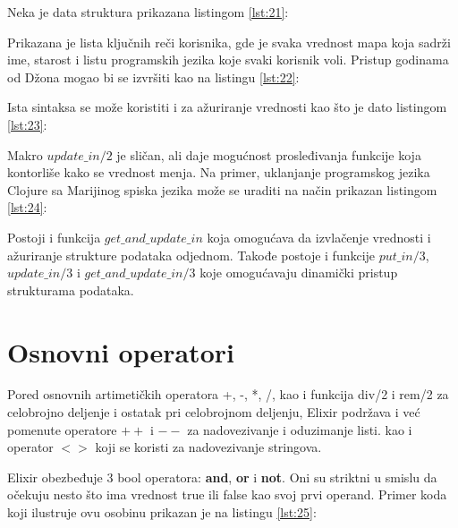 \documentclass[12pt,oneside]{memoir}
\begin{document}
Neka je data struktura prikazana listingom \ref{lst:21}:



Prikazana je lista ključnih reči korisnika, gde je svaka vrednost mapa koja sadrži ime, starost i listu programskih jezika koje svaki korisnik voli. Pristup godinama od Džona mogao bi se izvršiti kao na listingu \ref{lst:22}:



\newpage

Ista sintaksa se može koristiti i za ažuriranje vrednosti kao što je dato listingom \ref{lst:23}:



Makro $update\_in/2$ je sličan, ali daje mogućnost prosleđivanja funkcije koja kontorliše kako se vrednost menja. Na primer, uklanjanje programskog jezika Clojure sa Marijinog spiska jezika može se uraditi na način prikazan listingom \ref{lst:24}:



Postoji i funkcija $get\_and\_update\_in$ koja omogućava da izvlačenje vrednosti i ažuriranje strukture podataka odjednom. Takođe postoje i funkcije $put\_in/3$, $update\_in/3$ i $get\_and\_update\_in/3$ koje omogućavaju dinamički pristup strukturama podataka.

\newpage

\section{Osnovni operatori}

Pored osnovnih artimetičkih operatora +, -, *, /, kao i funkcija div/2 i rem/2 za celobrojno deljenje i ostatak pri celobrojnom deljenju, Elixir podržava i već pomenute operatore $++$ i $--$ za nadovezivanje i oduzimanje listi. kao i operator $<>$ koji se koristi za nadovezivanje stringova.

Elixir obezbeđuje 3 bool operatora: \textbf{and}, \textbf{or} i \textbf{not}. Oni su striktni u smislu da očekuju nesto što ima vrednost true ili false kao svoj prvi operand. Primer koda koji ilustruje ovu osobinu prikazan je na listingu \ref{lst:25}:
\end{document}
